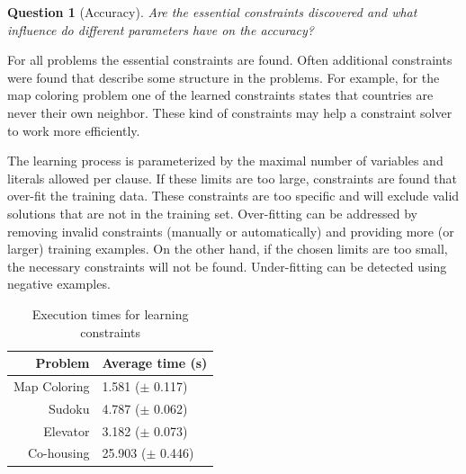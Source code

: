 \documentclass[letterpaper]{article}
\newtheorem{question}{Question}
\theoremstyle{definition}
\begin{document}
\begin{question}[Accuracy]
  Are the essential constraints discovered and what influence do different parameters have on the accuracy?
\end{question}
For all problems the essential constraints are found.
Often additional constraints were found that describe some structure in the problems.
For example, for the map coloring problem one of the learned constraints states that countries are never their own neighbor.
These kind of constraints may help a constraint solver to work more efficiently.

The learning process is parameterized by the maximal number of variables and literals allowed per clause.
If these limits are too large, constraints are found that over-fit the training data.
These constraints are too specific and will exclude valid solutions that are not in the training set.
Over-fitting can be addressed by removing invalid constraints (manually or automatically) and providing more (or larger) training examples.
On the other hand, if the chosen limits are too small, the necessary constraints will not be found.
Under-fitting can be detected using negative examples.

\begin{table}
  \caption{Execution times for learning constraints}
  \begin{tabularx}{\linewidth}{r|X}

\textbf{Problem}    & \textbf{Average time (s)} \\ %
\toprule
Map Coloring        & 1.581   ($\pm$ 0.117)     \\ %
Sudoku              & 4.787   ($\pm$ 0.062)     \\ %
Elevator            & 3.182   ($\pm$ 0.073)     \\ %
Co-housing          & 25.903  ($\pm$ 0.446)      %
  \end{tabularx}
  \label{tbl:uitvoering}
\end{table}
\end{document}
